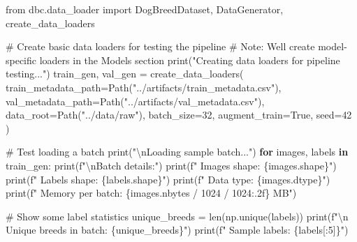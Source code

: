 \documentclass[
  letterpaper,
  DIV=11,
  numbers=noendperiod]{scrartcl}
\newenvironment{Shaded}{\begin{snugshade}}{\end{snugshade}}
\newcommand{\BuiltInTok}[1]{\textcolor[rgb]{0.00,0.23,0.31}{#1}}
\newcommand{\CharTok}[1]{\textcolor[rgb]{0.13,0.47,0.30}{#1}}
\newcommand{\CommentTok}[1]{\textcolor[rgb]{0.37,0.37,0.37}{#1}}
\newcommand{\ControlFlowTok}[1]{\textcolor[rgb]{0.00,0.23,0.31}{\textbf{#1}}}
\newcommand{\DecValTok}[1]{\textcolor[rgb]{0.68,0.00,0.00}{#1}}
\newcommand{\ImportTok}[1]{\textcolor[rgb]{0.00,0.46,0.62}{#1}}
\newcommand{\KeywordTok}[1]{\textcolor[rgb]{0.00,0.23,0.31}{\textbf{#1}}}
\newcommand{\NormalTok}[1]{\textcolor[rgb]{0.00,0.23,0.31}{#1}}
\newcommand{\OperatorTok}[1]{\textcolor[rgb]{0.37,0.37,0.37}{#1}}
\newcommand{\SpecialCharTok}[1]{\textcolor[rgb]{0.37,0.37,0.37}{#1}}
\newcommand{\SpecialStringTok}[1]{\textcolor[rgb]{0.13,0.47,0.30}{#1}}
\newcommand{\StringTok}[1]{\textcolor[rgb]{0.13,0.47,0.30}{#1}}
\newcommand{\VariableTok}[1]{\textcolor[rgb]{0.07,0.07,0.07}{#1}}
\renewenvironment{Shaded}{%
  \begin{tcolorbox}[%
    enhanced,%
    colback=codebg,%
    colframe=codebg,%
    borderline west={3pt}{0pt}{sectionblue},%
    boxrule=0pt,%
    arc=0pt,%
    boxsep=5pt,%
    left=2mm,%
    right=2mm,%
    top=2mm,%
    bottom=2mm%
  ]%
}{%
  \end{tcolorbox}%
}
\begin{document}
\begin{Shaded}
\begin{Highlighting}[]
\ImportTok{from}\NormalTok{ dbc.data\_loader }\ImportTok{import}\NormalTok{ DogBreedDataset, DataGenerator, create\_data\_loaders}

\CommentTok{\# Create basic data loaders for testing the pipeline}
\CommentTok{\# Note: We\textquotesingle{}ll create model{-}specific loaders in the Models section}
\BuiltInTok{print}\NormalTok{(}\StringTok{"Creating data loaders for pipeline testing..."}\NormalTok{)}
\NormalTok{train\_gen, val\_gen }\OperatorTok{=}\NormalTok{ create\_data\_loaders(}
\NormalTok{    train\_metadata\_path}\OperatorTok{=}\NormalTok{Path(}\StringTok{"../artifacts/train\_metadata.csv"}\NormalTok{),}
\NormalTok{    val\_metadata\_path}\OperatorTok{=}\NormalTok{Path(}\StringTok{"../artifacts/val\_metadata.csv"}\NormalTok{),}
\NormalTok{    data\_root}\OperatorTok{=}\NormalTok{Path(}\StringTok{"../data/raw"}\NormalTok{),}
\NormalTok{    batch\_size}\OperatorTok{=}\DecValTok{32}\NormalTok{,}
\NormalTok{    augment\_train}\OperatorTok{=}\VariableTok{True}\NormalTok{,}
\NormalTok{    seed}\OperatorTok{=}\DecValTok{42}
\NormalTok{)}

\CommentTok{\# Test loading a batch}
\BuiltInTok{print}\NormalTok{(}\StringTok{"}\CharTok{\textbackslash{}n}\StringTok{Loading sample batch..."}\NormalTok{)}
\ControlFlowTok{for}\NormalTok{ images, labels }\KeywordTok{in}\NormalTok{ train\_gen:}
    \BuiltInTok{print}\NormalTok{(}\SpecialStringTok{f"}\CharTok{\textbackslash{}n}\SpecialStringTok{Batch details:"}\NormalTok{)}
    \BuiltInTok{print}\NormalTok{(}\SpecialStringTok{f"  Images shape: }\SpecialCharTok{\{}\NormalTok{images}\SpecialCharTok{.}\NormalTok{shape}\SpecialCharTok{\}}\SpecialStringTok{"}\NormalTok{)}
    \BuiltInTok{print}\NormalTok{(}\SpecialStringTok{f"  Labels shape: }\SpecialCharTok{\{}\NormalTok{labels}\SpecialCharTok{.}\NormalTok{shape}\SpecialCharTok{\}}\SpecialStringTok{"}\NormalTok{)}
    \BuiltInTok{print}\NormalTok{(}\SpecialStringTok{f"  Data type: }\SpecialCharTok{\{}\NormalTok{images}\SpecialCharTok{.}\NormalTok{dtype}\SpecialCharTok{\}}\SpecialStringTok{"}\NormalTok{)}
    \BuiltInTok{print}\NormalTok{(}\SpecialStringTok{f"  Memory per batch: }\SpecialCharTok{\{}\NormalTok{images}\SpecialCharTok{.}\NormalTok{nbytes }\OperatorTok{/} \DecValTok{1024} \OperatorTok{/} \DecValTok{1024}\SpecialCharTok{:.2f\}}\SpecialStringTok{ MB"}\NormalTok{)}
    
    \CommentTok{\# Show some label statistics}
\NormalTok{    unique\_breeds }\OperatorTok{=} \BuiltInTok{len}\NormalTok{(np.unique(labels))}
    \BuiltInTok{print}\NormalTok{(}\SpecialStringTok{f"}\CharTok{\textbackslash{}n}\SpecialStringTok{  Unique breeds in batch: }\SpecialCharTok{\{}\NormalTok{unique\_breeds}\SpecialCharTok{\}}\SpecialStringTok{"}\NormalTok{)}
    \BuiltInTok{print}\NormalTok{(}\SpecialStringTok{f"  Sample labels: }\SpecialCharTok{\{}\NormalTok{labels[:}\DecValTok{5}\NormalTok{]}\SpecialCharTok{\}}\SpecialStringTok{"}\NormalTok{)}
    

\end{Highlighting}
\end{Shaded}
\end{document}
